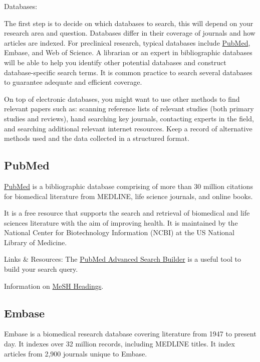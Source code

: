 \documentclass[
]{book}
\begin{document}
Databases:

The first step is to decide on which databases to search, this will depend on your research area and question. Databases differ in their coverage of journals and how articles are indexed. For preclinical research, typical databases include \href{https://pubmed.ncbi.nlm.nih.gov/}{PubMed}, Embase, and Web of Science. A librarian or an expert in bibliographic databases will be able to help you identify other potential databases and construct database-specific search terms. It is common practice to search several databases to guarantee adequate and efficient coverage.

On top of electronic databases, you might want to use other methods to find relevant papers such as: scanning reference lists of relevant studies (both primary studies and reviews), hand searching key journals, contacting experts in the field, and searching additional relevant internet resources. Keep a record of alternative methods used and the data collected in a structured format.

\hypertarget{pubmed}{%
\subsection{PubMed}\label{pubmed}}

\href{https://pubmed.ncbi.nlm.nih.gov/}{PubMed} is a bibliographic database comprising of more than 30 million citations for biomedical literature from MEDLINE, life science journals, and online books.

It is a free resource that supports the search and retrieval of biomedical and life sciences literature with the aim of improving health. It is maintained by the National Center for Biotechnology Information (NCBI) at the US National Library of Medicine.

Links \& Resources:
The \href{https://www.ncbi.nlm.nih.gov/pubmed/advanced}{PubMed Advanced Search Builder} is a useful tool to build your search query.

Information on \href{https://www.nlm.nih.gov/mesh/meshhome.html}{MeSH Headings}.

\hypertarget{embase}{%
\subsection{Embase}\label{embase}}

Embase is a biomedical research database covering literature from 1947 to present day. It indexes over 32 million records, including MEDLINE titles. It index articles from 2,900 journals unique to Embase.
\end{document}
